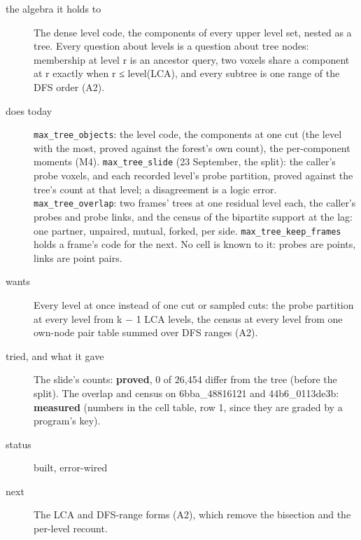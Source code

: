 \begin{description}
\item[{the algebra it holds to}] The dense level code, the components of every upper level set, nested as a tree. Every question about levels is a question about tree nodes: membership at level r is an ancestor query, two voxels share a component at r exactly when r ≤ level(LCA), and every subtree is one range of the DFS order (A2).
\item[{does today}] \texttt{max\_\allowbreak{}tree\_\allowbreak{}objects}: the level code, the components at one cut (the level with the most, proved against the forest's own count), the per-component moments (M4). \texttt{max\_\allowbreak{}tree\_\allowbreak{}slide} (23 September, the split): the caller's probe voxels, and each recorded level's probe partition, proved against the tree's count at that level; a disagreement is a logic error. \texttt{max\_\allowbreak{}tree\_\allowbreak{}overlap}: two frames' trees at one residual level each, the caller's probes and probe links, and the census of the bipartite support at the lag: one partner, unpaired, mutual, forked, per side. \texttt{max\_\allowbreak{}tree\_\allowbreak{}keep\_\allowbreak{}frames} holds a frame's code for the next. No cell is known to it: probes are points, links are point pairs.
\item[{wants}] Every level at once instead of one cut or sampled cuts: the probe partition at every level from k − 1 LCA levels, the census at every level from one own-node pair table summed over DFS ranges (A2).
\item[{tried, and what it gave}] The slide's counts: \textbf{proved}, 0 of 26,454 differ from the tree (before the split). The overlap and census on 6bba\_\allowbreak{}48816121 and 44b6\_\allowbreak{}0113de3b: \textbf{measured} (numbers in the cell table, row 1, since they are graded by a program's key).
\item[{status}] built, error-wired
\item[{next}] The LCA and DFS-range forms (A2), which remove the bisection and the per-level recount.
\end{description}

